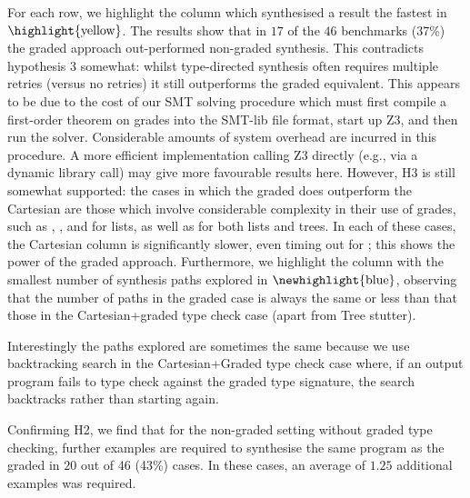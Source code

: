 For each row, we highlight the column which synthesised a result the fastest in
$\highlight{\text{yellow}}$. The results show that in $17$ of the $46$ benchmarks
(37\%) the graded approach out-performed non-graded synthesis. This contradicts
hypothesis 3 somewhat: whilst type-directed synthesis often requires multiple
retries (versus no retries) it still outperforms the graded equivalent. This
appears to be due to the cost of our SMT solving procedure which must first
compile a first-order theorem on grades into the SMT-lib file format, start up
Z3, and then run the solver. Considerable amounts of system overhead are
incurred in this procedure. A more efficient implementation calling Z3 directly
(e.g., via a dynamic library call) may give more favourable results here.
However, H3 is still somewhat supported: the cases in which the graded does
outperform the Cartesian are those which involve considerable complexity in
their use of grades, such as , , and 
for lists, as well as  for both lists and trees. In each of these
cases, the Cartesian column is significantly slower, even timing out for
; this shows the power of the graded approach. Furthermore, we
highlight the column with the smallest number of synthesis paths explored in
$\newhighlight{\text{blue}}$, observing that the number of paths in the graded
case is always the same or less than that those in the Cartesian+graded type
check case (apart from Tree stutter). 

Interestingly the paths explored are sometimes the same because we use
backtracking search in the Cartesian+Graded type check case where, if an output
program fails to type check against the graded type signature, the search
backtracks rather than starting again.

Confirming H2, we find that for the non-graded setting without graded
type checking, further examples are required to synthesise the same program as
the graded in $20$ out of $46$ (43\%) cases. In these cases, an average of
$1.25$ additional examples was required.

